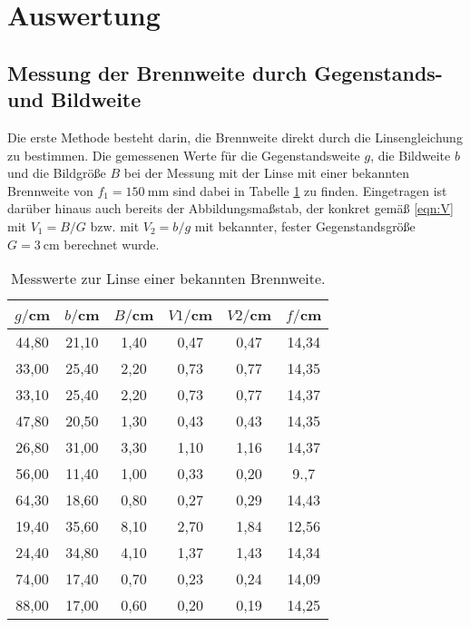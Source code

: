 \section{Auswertung}
\label{sec:Auswertung}

\subsection{Messung der Brennweite durch Gegenstands- und Bildweite}
Die erste Methode besteht darin, die Brennweite direkt durch die Linsengleichung
zu bestimmen. Die gemessenen Werte für die Gegenstandsweite $g$, die Bildweite
$b$ und die Bildgröße $B$  bei der Messung mit der Linse mit einer bekannten
Brennweite von $f_1 = \SI{150}{\milli\meter}$ sind dabei in Tabelle
\ref{tab:bekannt} zu finden. Eingetragen ist darüber hinaus auch bereits der
Abbildungsmaßstab, der konkret gemäß \eqref{eqn:V} mit $V_1=B/G$ bzw. mit $V_2=b/g$
mit bekannter, fester Gegenstandsgröße $G = \SI{3}{\centi\meter}$ berechnet wurde.


\begin{table}[htp]
	\begin{center}
    \caption{Messwerte zur Linse einer bekannten Brennweite.}
    \label{tab:bekannt}
		\begin{tabular}{cccccc}
		\toprule
			{$g/$cm} & {$b/$cm} & {$B/$cm} & {$V1/$cm} & {$V2/$cm} & {$f/$cm}\\
			\midrule
			44,80 & 21,10 & 1,40 & 0,47 & 0,47 & 14,34\\
			33,00 & 25,40 & 2,20 & 0,73 & 0,77 & 14,35\\
			33,10 & 25,40 & 2,20 & 0,73 & 0,77 & 14,37\\
			47,80 & 20,50 & 1,30 & 0,43 & 0,43 & 14,35\\
			26,80 & 31,00 & 3,30 & 1,10 & 1,16 & 14,37\\
			56,00 & 11,40 & 1,00 & 0,33 & 0,20 & 9.,7\\
			64,30 & 18,60 & 0,80 & 0,27 & 0,29 & 14,43\\
			19,40 & 35,60 & 8,10 & 2,70 & 1,84 & 12,56\\
			24,40 & 34,80 & 4,10 & 1,37 & 1,43 & 14,34\\
			74,00 & 17,40 & 0,70 & 0,23 & 0,24 & 14,09\\
			88,00 & 17,00 & 0,60 & 0,20 & 0,19 & 14,25\\
		\bottomrule
		\end{tabular}
	\end{center}
\end{table}


